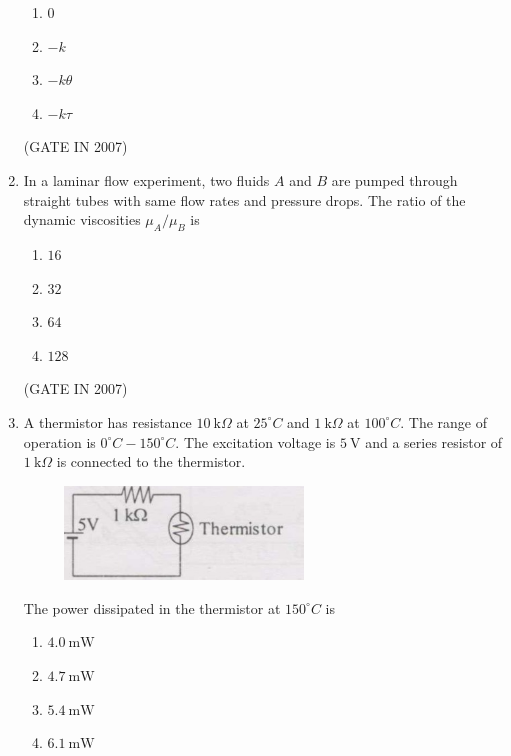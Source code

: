 \documentclass[journal]{IEEEtran}
\begin{document}
\begin{enumerate}
\begin{multicols}{4}
\begin{enumerate}
\item $0$  
\item $-k$  
\item $-k\theta$  
\item $-k\tau$  
\end{enumerate}
\end{multicols}
\hfill(GATE IN 2007)
\item In a laminar flow experiment, two fluids $A$ and $B$ are pumped through straight tubes with same flow rates and pressure drops. The ratio of the dynamic viscosities $\mu_A / \mu_B$ is  

\begin{multicols}{4}
\begin{enumerate}
\item $16$  
\item $32$  
\item $64$  
\item $128$  
\end{enumerate}
\end{multicols}
\hfill(GATE IN 2007)
\item A thermistor has resistance $10\ \mathrm{k}\Omega$ at $25^\circ C$ and $1\ \mathrm{k}\Omega$ at $100^\circ C$. The range of operation is $0^\circ C - 150^\circ C$. The excitation voltage is $5\ \mathrm{V}$ and a series resistor of $1\ \mathrm{k}\Omega$ is connected to the thermistor.
\begin{figure}[H]
    \centering
      \includegraphics[width=0.6\textwidth]{28.jpg} 
      \caption{}
    \label{fig:fig28} 
\end{figure}
The power dissipated in the thermistor at $150^\circ C$ is  

\begin{multicols}{4}
\begin{enumerate}
\item $4.0\ \mathrm{mW}$  
\item $4.7\ \mathrm{mW}$  
\item $5.4\ \mathrm{mW}$  
\item $6.1\ \mathrm{mW}$  
\end{enumerate}
\end{multicols}


\end{enumerate}
\end{document}
